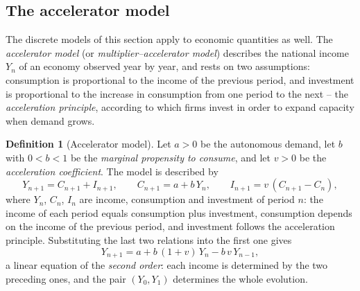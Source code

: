 \documentclass[11pt,a4paper]{article}
\theoremstyle{definition} \newtheorem{definition}{Definition} \theoremstyle{plain} \newtheorem{theorem}{Theorem}
\begin{document}
\subsection{The accelerator model}

The discrete models of this section apply to economic quantities as
well. The \emph{accelerator model} (or \emph{multiplier--accelerator
model}) describes the national income $Y_n$ of an economy observed year
by year, and rests on two assumptions: consumption is proportional to
the income of the previous period, and investment is proportional to the
increase in consumption from one period to the next -- the
\emph{acceleration principle}, according to which firms invest in order
to expand capacity when demand grows.

\begin{definition}[Accelerator model] Let $a>0$ be the autonomous demand,
let $b$ with $0<b<1$ be the \emph{marginal propensity to consume}, and let
$v>0$ be the \emph{acceleration coefficient}. The model is described by
\[ Y_{n+1} = C_{n+1} + I_{n+1}, \qquad
   C_{n+1} = a + b\,Y_n, \qquad
   I_{n+1} = v\,(C_{n+1}-C_n), \]
where $Y_n$, $C_n$, $I_n$ are income, consumption and investment of
period $n$: the income of each period equals consumption plus investment,
consumption depends on the income of the previous period, and investment
follows the acceleration principle. Substituting the last two relations
into the first one gives
\[ Y_{n+1} = a + b\,(1+v)\,Y_n - b\,v\,Y_{n-1}, \]
a linear equation of the \emph{second order}: each income is determined
by the two preceding ones, and the pair $(Y_0,Y_1)$ determines the whole
evolution. \end{definition}
\end{document}
